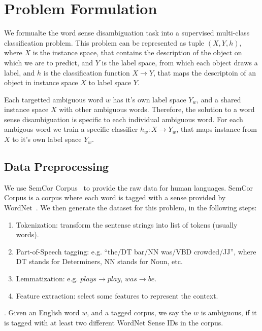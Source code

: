 \section{Problem Formulation}

We formualte the word sense disambiguation task into a supervised multi-class
classification problem.
This problem can be represented as tuple $(X,Y,h)$, where $X$ is the instance
space, that contains the description of the object on which we are to predict, 
and $Y$ is the label space, from which each object draws a label,
and $h$ is the classification function $X \rightarrow Y$, that maps the
descriptoin of an object in instance space $X$ to label space $Y$.

Each targetted ambiguous word $w$ has it's own label space $Y_w$, and a shared
instance space $X$ with other ambiguous words.
Therefore, the solution to a word sense disambiguation is specific to each
individual ambiguous word.
For each ambigous word we train a specific classifier $h_w: X
\rightarrow Y_w$, that maps instance from $X$ to it's own label space $Y_w$.


\subsection{Data Preprocessing}
\label{sec:formulate:preprocess}

We use SemCor Corpus~\cite{semcor} to provide the raw data for human languages.
SemCor Corpus is a corpus where each word is tagged with a sense provided by
WordNet~\cite{wordnet}.
We then generate the dataset for this problem, in the following steps:

\begin{enumerate}
  \item Tokenization: transform the sentense strings into list of tokens
    (usually words).
  \item Part-of-Speech tagging: e.g. ``the/DT bar/NN was/VBD crowded/JJ'', where
    DT stands for Determiners, NN stands for Noun, etc.
  \item Lemmatization: e.g. $plays \rightarrow play$, $was \rightarrow be$.
  \item Feature extraction: select some features to represent the context.
\end{enumerate}

. 
Given an English word $w$, and a tagged corpus, we say the $w$ is ambiguous, if
it is tagged with at least two different WordNet Sense IDs in the corpus.


